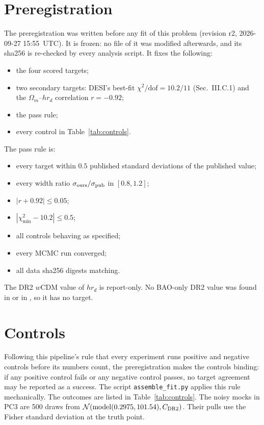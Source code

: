 \documentclass[11pt]{article}
\begin{document}
\section{Preregistration}

The preregistration was written before any fit of this problem (revision r2,
2026-09-27 15:55~UTC). It is frozen: no file of it was modified afterwards,
and its sha256 is re-checked by every analysis script. It fixes the
following:
\begin{itemize}
\item the four scored targets;
\item two secondary targets: DESI's best-fit $\chi^2/\mathrm{dof}=10.2/11$
\cite{desi2025dr2} (Sec.~III.C.1) and the $\Omega_m$--$hr_d$ correlation
$r=-0.92$;
\item the pass rule;
\item every control in Table~\ref{tab:controls}.
\end{itemize}

The pass rule is:
\begin{itemize}
\item every target within $0.5$ published standard deviations of the
published value;
\item every width ratio $\sigma_{\rm ours}/\sigma_{\rm pub}$ in $[0.8,1.2]$;
\item $|r+0.92|\le0.05$;
\item $|\chi^2_{\min}-10.2|\le0.5$;
\item all controls behaving as specified;
\item every MCMC run converged;
\item all data sha256 digests matching.
\end{itemize}

The DR2 $w$CDM value of $hr_d$ is report-only. No BAO-only DR2 value was
found in \cite{desi2025dr2} or in \cite{lodha2025}, so it has no target.

\section{Controls}

Following this pipeline's rule that every experiment runs positive and
negative controls before its numbers count, the preregistration makes the
controls binding: if any positive control fails or any negative control
passes, no target agreement may be reported as a success. The script
\texttt{assemble\_fit.py} applies this rule mechanically. The outcomes are listed in
Table~\ref{tab:controls}. The noisy mocks in PC3 are 500 draws from
$\mathcal N(\mathrm{model}(0.2975,101.54),C_{\rm DR2})$. Their pulls use the
Fisher standard deviation at the truth point.
\end{document}
